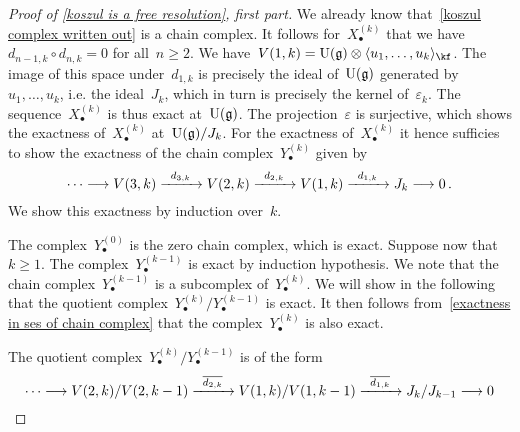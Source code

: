 \begin{proof}[Proof of \cref{koszul is a free resolution}, first part]
  We already know that~\eqref{koszul complex written out} is a chain complex.
  It follows for~$X^{(k)}_\bullet$ that we have~$d_{n-1,k} \circ d_{n,k} = 0$ for all~$n \geq 2$.
  We have~$V(1,k) = \Univ(\glie) \otimes \gen{u_1, \dotsc, u_k}_{\kf}$.
  The image of this space under~$d_{1,k}$ is precisely the ideal of~$\operatorname{U}(\mathfrak{g})$ generated by~$u_1, \dotsc, u_k$, i.e. the ideal~$J_k$, which in turn is precisely the kernel of~$\varepsilon_k$.
  The sequence~$X^{(k)}_\bullet$ is thus exact at~$\operatorname{U}(\mathfrak{g})$.
  The projection~$\varepsilon$ is surjective, which shows the exactness of~$X^{(k)}_\bullet$ at~$\operatorname{U}(\mathfrak{g}) / J_k$.
  For the exactness of~$X^{(k)}_\bullet$ it hence sufficies to show the exactness of the chain complex~$Y^{(k)}_\bullet$ given by
  \[
    \dotsb
    \to
    V(3,k)
    \xto{d_{3,k}}
    V(2,k)
    \xto{d_{2,k}}
    V(1,k)
    \xto{d_{1,k}}
    J_k
    \to
    0 \,.
  \]
  We show this exactness by induction over~$k$.

  The complex~$Y^{(0)}_\bullet$ is the zero chain complex, which is exact.
  Suppose now that~$k \geq 1$.
  The complex~$Y^{(k-1)}_\bullet$ is exact by induction hypothesis.
  We note that the chain complex~$Y^{(k-1)}_\bullet$ is a subcomplex of~$Y^{(k)}_\bullet$.
  We will show in the following that the quotient complex~$Y^{(k)}_\bullet / Y^{(k-1)}_\bullet$ is exact.
  It then follows from~\cref{exactness in ses of chain complex} that the complex~$Y^{(k)}_\bullet$ is also exact.

  The quotient complex~$Y^{(k)}_\bullet / Y^{(k-1)}_\bullet$ is of the form
  \[
    \dotsb
    \to
    V(2,k) / V(2, k-1)
    \xto{\induced{d_{2,k}}}
    V(1,k) / V(1, k-1)
    \xto{\induced{d_{1,k}}}
    J_k / J_{k-1}
    \to
    0
  \]


\end{proof}
